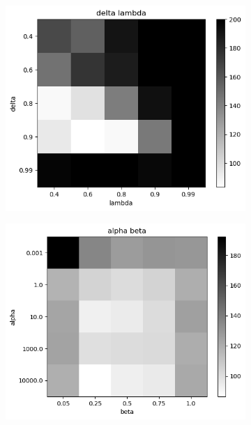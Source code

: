 \documentclass{article}
\begin{document}
\begin{figure}[h]
	\centering
	\begin{subfigure}[t]{0.28\linewidth}
		\centering
		\includegraphics[width = 1.0\linewidth, trim={0 0 0 0}, clip=true]{figures/real_delta_lambda_heat.png}
		\label{fig:delta_lambda}	
	\end{subfigure}%
	\hspace{0.05\linewidth}
	\begin{subfigure}[t]{0.28\linewidth}
		\centering
		\includegraphics[width = 1.0\linewidth, trim={0 0 0 0}, clip=true]{figures/test_alpha_beta_heat.png}

\end{subfigure}
\end{figure}
\end{document}
